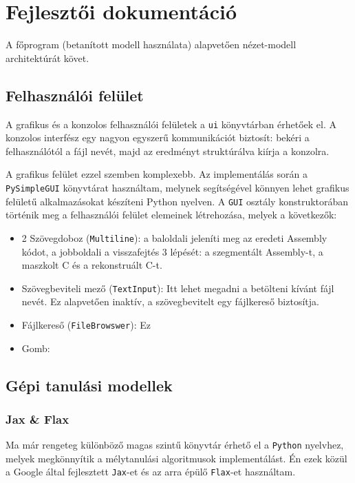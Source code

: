 \chapter{Fejlesztői dokumentáció}
\label{ch:impl}

A főprogram (betanított modell használata) alapvetően nézet-modell
architektúrát követ.

\section{Felhasználói felület}
A grafikus és a konzolos felhasználói felületek a \texttt{ui} könyvtárban
érhetőek el. A konzolos interfész egy nagyon egyszerű kommunikációt biztosít:
bekéri a felhasználótól a fájl nevét, majd az eredményt struktúrálva kiírja
a konzolra.

A grafikus felület ezzel szemben komplexebb. Az implementálás során
a \texttt{PySimpleGUI}\cite{TODO} könyvtárat használtam, melynek segítségével
könnyen lehet grafikus felületű alkalmazásokat készíteni Python nyelven.
A \texttt{GUI} osztály konstruktorában történik meg a felhasználói felület
elemeinek létrehozása, melyek a következők:
\begin{itemize}
    \item 2 Szövegdoboz (\texttt{Multiline}): a baloldali jeleníti meg az
    eredeti Assembly kódot, a jobboldali a visszafejtés 3 lépését:
    a szegmentált Assembly-t, a maszkolt C és a rekonstruált C-t.
    \item Szövegbeviteli mező (\texttt{TextInput}): Itt lehet megadni
    a betölteni kívánt fájl nevét. Ez alapvetően inaktív, a szövegbevitelt egy
    fájlkereső biztosítja.
    \item Fájlkereső (\texttt{FileBrowswer}): Ez
    \item Gomb: 
\end{itemize}

\section{Gépi tanulási modellek}

\subsection{Jax \& Flax}
Ma már rengeteg különböző magas szintű könyvtár érhető el a \texttt{Python} nyelvhez, melyek megkönnyítik a mélytanulási algoritmusok implementálást. Én ezek közül a Google által fejlesztett \texttt{Jax}-et\cite{jax2018github} és az arra épülő \texttt{Flax}-et\cite{flax2020github} használtam.

